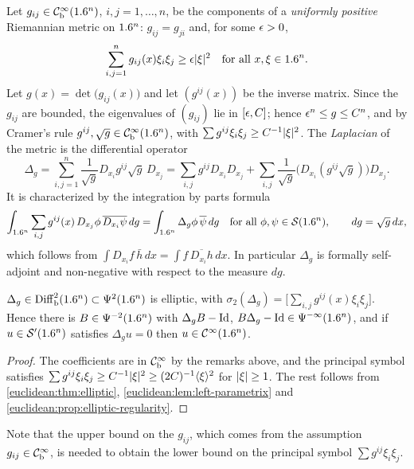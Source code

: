 Let $g_{ij}\in\mathcal{C}^\infty_{\mathrm{b}}(1.6^n)$, $i,j=1,\dots,n$, be the components of a
\emph{uniformly positive} Riemannian metric on $1.6^n$: $g_{ij}=g_{ji}$ and,
for some $\epsilon>0$,
\begin{equation}\label{euclidean:eq:metric}
  \sum_{i,j=1}^ng_{ij}(x)\xi_i\xi_j\ge\epsilon\lvert \xi\rvert^2\quad\text{for all }x,\xi\in1.6^n.
\end{equation}
Let $g(x)=\det\bigl(g_{ij}(x)\bigr)$ and let $(g^{ij}(x))$ be the inverse
matrix. Since the $g_{ij}$ are bounded, the eigenvalues of $(g_{ij})$ lie in
$[\epsilon,C]$; hence $\epsilon^n\le g\le C^n$, and by Cramer's rule
$g^{ij},\sqrt g\in\mathcal{C}^\infty_{\mathrm{b}}(1.6^n)$, with
$\sum g^{ij}\xi_i\xi_j\ge C^{-1}\lvert \xi\rvert^2$. The \emph{Laplacian} of the metric
is the differential operator
\begin{equation*}
  \Delta_g=\sum_{i,j=1}^n\frac1{\sqrt g}D_{x_i}g^{ij}\sqrt g\,D_{x_j}
  =\sum_{i,j}g^{ij}D_{x_i}D_{x_j}+\sum_{i,j}\frac1{\sqrt g}
  \bigl(D_{x_i}(g^{ij}\sqrt g)\bigr)D_{x_j}.
\end{equation*}
It is characterized by the integration by parts formula
\begin{equation*}
  \int_{1.6^n}\sum_{i,j}g^{ij}(x)\,D_{x_j}\phi\,\overline{D_{x_i}\psi}\,dg
  =\int_{1.6^n}\Delta_g\phi\,\overline\psi\,dg\quad\text{for all }\phi,\psi\in\mathcal{S}(1.6^n),
  \qquad dg=\sqrt g\,dx,
\end{equation*}
which follows from $\int D_{x_i}f\,\bar h\,dx=\int f\,\overline{D_{x_i}h}\,dx$.
In particular $\Delta_g$ is formally self-adjoint and non-negative with
respect to the measure $dg$.

\begin{proposition}\label{euclidean:prop:laplacian}
  $\Delta_g\in\operatorname{Diff}^{2}_{\mathrm b}(1.6^n)\subset\Psi^{2}(1.6^n)$ is elliptic, with
  $\sigma_2(\Delta_g)=\bigl[\sum_{i,j}g^{ij}(x)\xi_i\xi_j\bigr]$. Hence there
  is $B\in\Psi^{-2}(1.6^n)$ with $\Delta_gB-\operatorname{Id}$,
  $B\Delta_g-\operatorname{Id}\in\Psi^{-\infty}(1.6^n)$, and if $u\in\mathcal{S}'(1.6^n)$ satisfies
  $\Delta_gu=0$ then $u\in\mathcal{C}^\infty(1.6^n)$.
\end{proposition}
\begin{proof}
  The coefficients are in $\mathcal{C}^\infty_{\mathrm{b}}$ by the remarks above, and the principal symbol
  satisfies $\sum g^{ij}\xi_i\xi_j\ge C^{-1}\lvert \xi\rvert^2\ge(2C)^{-1}\langle \xi\rangle^2$
  for $\lvert \xi\rvert\ge1$. The rest follows from \cref{euclidean:thm:elliptic},
  \cref{euclidean:lem:left-parametrix} and
  \cref{euclidean:prop:elliptic-regularity}.
\end{proof}

Note that the upper bound on the $g_{ij}$, which comes from the assumption
$g_{ij}\in\mathcal{C}^\infty_{\mathrm{b}}$, is needed to obtain the lower bound on the principal symbol
$\sum g^{ij}\xi_i\xi_j$.

